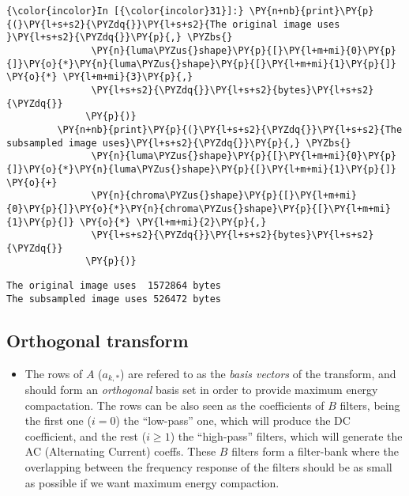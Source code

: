     \begin{Verbatim}[commandchars=\\\{\}]
{\color{incolor}In [{\color{incolor}31}]:} \PY{n+nb}{print}\PY{p}{(}\PY{l+s+s2}{\PYZdq{}}\PY{l+s+s2}{The original image uses }\PY{l+s+s2}{\PYZdq{}}\PY{p}{,} \PYZbs{}
               \PY{n}{luma\PYZus{}shape}\PY{p}{[}\PY{l+m+mi}{0}\PY{p}{]}\PY{o}{*}\PY{n}{luma\PYZus{}shape}\PY{p}{[}\PY{l+m+mi}{1}\PY{p}{]} \PY{o}{*} \PY{l+m+mi}{3}\PY{p}{,}
               \PY{l+s+s2}{\PYZdq{}}\PY{l+s+s2}{bytes}\PY{l+s+s2}{\PYZdq{}}
              \PY{p}{)}
         \PY{n+nb}{print}\PY{p}{(}\PY{l+s+s2}{\PYZdq{}}\PY{l+s+s2}{The subsampled image uses}\PY{l+s+s2}{\PYZdq{}}\PY{p}{,} \PYZbs{}
               \PY{n}{luma\PYZus{}shape}\PY{p}{[}\PY{l+m+mi}{0}\PY{p}{]}\PY{o}{*}\PY{n}{luma\PYZus{}shape}\PY{p}{[}\PY{l+m+mi}{1}\PY{p}{]} \PY{o}{+}
               \PY{n}{chroma\PYZus{}shape}\PY{p}{[}\PY{l+m+mi}{0}\PY{p}{]}\PY{o}{*}\PY{n}{chroma\PYZus{}shape}\PY{p}{[}\PY{l+m+mi}{1}\PY{p}{]} \PY{o}{*} \PY{l+m+mi}{2}\PY{p}{,}
               \PY{l+s+s2}{\PYZdq{}}\PY{l+s+s2}{bytes}\PY{l+s+s2}{\PYZdq{}}
              \PY{p}{)}
\end{Verbatim}


    \begin{Verbatim}[commandchars=\\\{\}]
The original image uses  1572864 bytes
The subsampled image uses 526472 bytes

    \end{Verbatim}

    \hypertarget{orthogonal-transform}{%
\subsection{Orthogonal transform}\label{orthogonal-transform}}

\begin{itemize}
\tightlist
\item
  The rows of \(A\) (\(a_{k,*}\)) are refered to as the \emph{basis
  vectors} of the transform, and should form an \emph{orthogonal} basis
  set in order to provide maximum energy compactation. The rows can be
  also seen as the coefficients of \(B\) filters, being the first one
  (\(i=0\)) the ``low-pass'' one, which will produce the DC coefficient,
  and the rest (\(i\geq 1\)) the ``high-pass'' filters, which will
  generate the AC (Alternating Current) coeffs. These \(B\) filters form
  a filter-bank where the overlapping between the frequency response of
  the filters should be as small as possible if we want maximum energy
  compaction.
\end{itemize}

